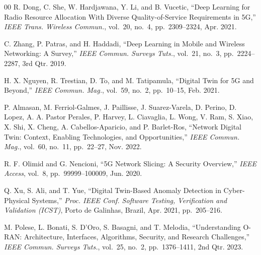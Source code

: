 \documentclass[conference]{IEEEtran}
\begin{document}
\begin{thebibliography}{00}
R. Dong, C. She, W. Hardjawana, Y. Li, and B. Vucetic,
``Deep Learning for Radio Resource Allocation With Diverse Quality-of-Service
Requirements in 5G,''
\emph{IEEE Trans. Wireless Commun.},
vol.~20, no.~4, pp.~2309--2324, Apr. 2021.

C. Zhang, P. Patras, and H. Haddadi,
``Deep Learning in Mobile and Wireless Networking: A Survey,''
\emph{IEEE Commun. Surveys Tuts.},
vol.~21, no.~3, pp.~2224--2287, 3rd Qtr. 2019.

H. X. Nguyen, R. Trestian, D. To, and M. Tatipamula,
``Digital Twin for 5G and Beyond,''
\emph{IEEE Commun. Mag.},
vol.~59, no.~2, pp.~10--15, Feb. 2021.

P. Almasan, M. Ferriol-Galmes, J. Paillisse, J. Suarez-Varela,
D. Perino, D. Lopez, A. A. Pastor Perales, P. Harvey, L. Ciavaglia,
L. Wong, V. Ram, S. Xiao, X. Shi, X. Cheng, A. Cabellos-Aparicio,
and P. Barlet-Ros,
``Network Digital Twin: Context, Enabling Technologies, and Opportunities,''
\emph{IEEE Commun. Mag.},
vol.~60, no.~11, pp.~22--27, Nov. 2022.

R. F. Olimid and G. Nencioni,
``5G Network Slicing: A Security Overview,''
\emph{IEEE Access},
vol.~8, pp.~99999--100009, Jun. 2020.

Q. Xu, S. Ali, and T. Yue,
``Digital Twin-Based Anomaly Detection in Cyber-Physical Systems,''
\emph{Proc. IEEE Conf. Software Testing, Verification and Validation (ICST)},
Porto de Galinhas, Brazil, Apr. 2021, pp.~205--216.

M. Polese, L. Bonati, S. D'Oro, S. Basagni, and T. Melodia,
``Understanding O-RAN: Architecture, Interfaces, Algorithms, Security,
and Research Challenges,''
\emph{IEEE Commun. Surveys Tuts.},
vol.~25, no.~2, pp.~1376--1411, 2nd Qtr. 2023.

\end{thebibliography}
\end{document}
